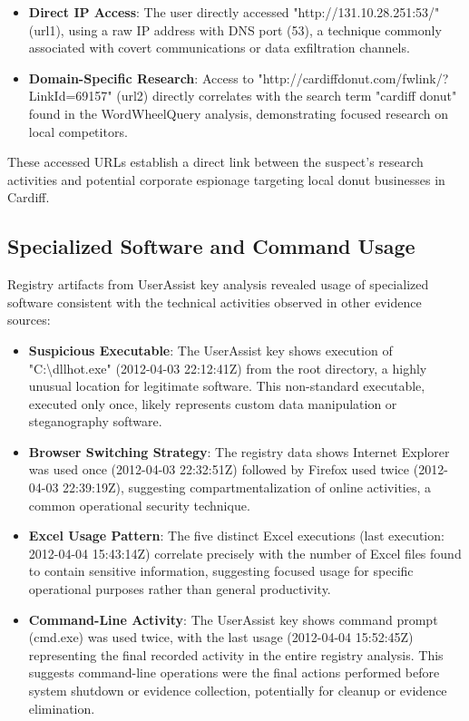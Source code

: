 \begin{itemize}
    \item \textbf{Direct IP Access}: The user directly accessed "http://131.10.28.251:53/" (url1), using a raw IP address with DNS port (53), a technique commonly associated with covert communications or data exfiltration channels.
    
    \item \textbf{Domain-Specific Research}: Access to "http://cardiffdonut.com/fwlink/?LinkId=69157" (url2) directly correlates with the search term "cardiff donut" found in the WordWheelQuery analysis, demonstrating focused research on local competitors.
\end{itemize}

These accessed URLs establish a direct link between the suspect's research activities and potential corporate espionage targeting local donut businesses in Cardiff.

\subsection{Specialized Software and Command Usage}
Registry artifacts from UserAssist key analysis revealed usage of specialized software consistent with the technical activities observed in other evidence sources:

\begin{itemize}
    \item \textbf{Suspicious Executable}: The UserAssist key shows execution of "C:\textbackslash dllhot.exe" (2012-04-03 22:12:41Z) from the root directory, a highly unusual location for legitimate software. This non-standard executable, executed only once, likely represents custom data manipulation or steganography software.
    
    \item \textbf{Browser Switching Strategy}: The registry data shows Internet Explorer was used once (2012-04-03 22:32:51Z) followed by Firefox used twice (2012-04-03 22:39:19Z), suggesting compartmentalization of online activities, a common operational security technique.
    
    \item \textbf{Excel Usage Pattern}: The five distinct Excel executions (last execution: 2012-04-04 15:43:14Z) correlate precisely with the number of Excel files found to contain sensitive information, suggesting focused usage for specific operational purposes rather than general productivity.
    
    \item \textbf{Command-Line Activity}: The UserAssist key shows command prompt (cmd.exe) was used twice, with the last usage (2012-04-04 15:52:45Z) representing the final recorded activity in the entire registry analysis. This suggests command-line operations were the final actions performed before system shutdown or evidence collection, potentially for cleanup or evidence elimination.
\end{itemize}

